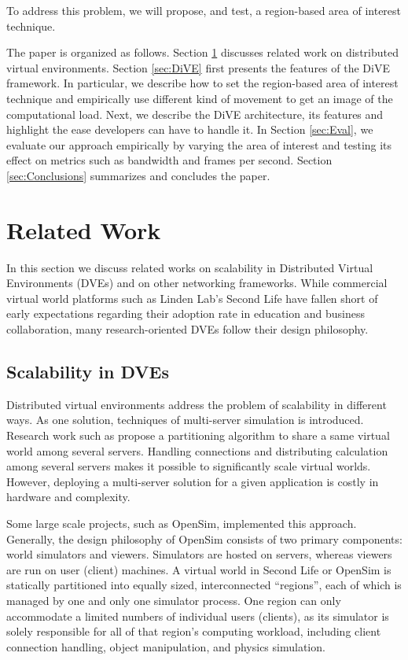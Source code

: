\documentclass[]{elsarticle}
\begin{document}
To address this problem, we will propose, and test, a region-based area of interest technique.

The paper is organized as follows. Section \ref{sec:RelWork} discusses related work on distributed virtual environments. Section \ref{sec:DiVE} first presents the features of the DiVE framework. In particular, we describe how to set the region-based area of interest technique and empirically use different kind of movement to get an image of the computational load. Next, we describe the DiVE architecture, its features and highlight the ease developers can have to handle it. In Section \ref{sec:Eval}, we evaluate our approach empirically by varying the area of interest and testing its effect on metrics such as bandwidth and frames per second. Section \ref{sec:Conclusions} summarizes and concludes the paper.

\section{Related Work}\label{sec:RelWork}

In this section we discuss related works on scalability in Distributed Virtual Environments (DVEs) and on other networking frameworks. While commercial virtual world platforms such as Linden Lab's Second Life have fallen short of early expectations regarding their adoption rate in education and business collaboration, many research-oriented DVEs follow their design philosophy.

\subsection{Scalability in DVEs}

Distributed virtual environments address the problem of scalability in different ways. As one solution, techniques of multi-server simulation is introduced.
Research work such as \cite{Lui+Chan.2002} propose a partitioning algorithm to share a same virtual world among several servers. Handling connections and distributing calculation among several servers makes it possible to significantly scale virtual worlds. However, deploying a multi-server solution for a given application is costly in hardware and complexity.

Some large scale projects, such as OpenSim, implemented this approach.
Generally, the design philosophy of OpenSim consists of two primary components: world simulators and viewers. Simulators are hosted on servers, whereas viewers are run on user (client) machines. A virtual world in Second Life or OpenSim is statically partitioned into equally sized, interconnected ``regions'', each of which is managed by one and only one simulator process. One region can only accommodate a limited numbers of individual users (clients), as its simulator is solely responsible for all of that region's computing workload, including client connection handling, object manipulation, and physics simulation.
\end{document}
